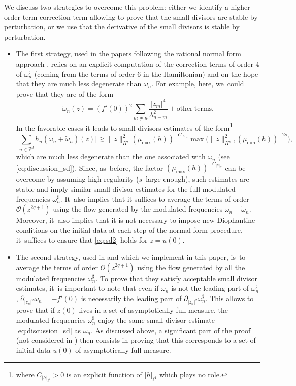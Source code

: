 \documentclass[10pt,a4paper]{amsart}
\theoremstyle{plain}
\theoremstyle{definition}
\newcommand{\1}{\mathbf{1}}
\begin{document}
We discuss two strategies to overcome this problem: either we identify a higher order term correction term allowing to prove that the small divisors are stable by perturbation, or we use that the derivative of the small divisors is stable by perturbation.
\begin{itemize}
\item The first strategy, used in the papers following the rational normal form approach \cite{KillBill,KtA,LX23}, relies on an explicit computation of the correction terms of order $4$ of $\omega_n^\sharp$ (coming from the terms of order 6 in the Hamiltonian) and on the hope that they are much less degenerate than $\omega_n$. For example, here, we~could prove that they are of the form
\[
\widetilde{\omega}_n(z) = (f'(0))^2 \sum_{m \neq n} \frac{|z_m|^4}{\lambda_{n-m}^2} + \mathrm{other \ terms}.
\]
In the favorable cases it leads to small divisors estimates of the form\footnote{where $C_{|h|_{\ell^1}}>0$ is an explicit function of $|h|_{\ell^1}$ which plays no role.}
\begin{equation}
\label{eq:sd2}
\Big| \sum_{n\in \mathbb{Z}^d} h_n (\omega_{n} + \widetilde{\omega}_n)(z) \Big| \gtrsim \| z\|_{H^s}^2 (\mu_{\max}(h))^{-C_{|h|_{\ell^1}}} \max\big(\| z\|_{H^s}^2, (\mu_{\min}(h))^{-2s} \big),
\end{equation}
which are much less degenerate than the one associated with $\omega_n$ (see \eqref{eq:discussion_sd}). Since, as~before, the factor $ (\mu_{\max}(h))^{-C_{|h|_{\ell^1}}}$ can be overcome by assuming high-regularity ($s$~large enough), such estimates are stable and imply similar small divisor estimates for the full modulated frequencies $\omega_n^\sharp$. It~also implies that it suffices to average the terms of order $\mathcal{O}(z^{2q+1})$ using the flow generated by the modulated frequencies $\omega_n+\widetilde{\omega}_n$. Moreover, it~also implies that it is not necessary to impose new Diophantine conditions on the initial data at each step of the normal form procedure, it~suffices to ensure that \eqref{eq:sd2} holds for $z=u(0)$.
\item The second strategy, used in \cite{Bou00} and which we implement in this paper, is~to average the terms of order $\mathcal{O}(z^{2q+1})$ using the flow generated by all the modulated frequencies $\omega_n^\sharp$. To prove that they satisfy acceptable small divisor estimates, it~is important to note that even if $\omega_n$ is not the leading part of $\omega_n^\sharp$, $\partial_{|z_n|^2} \omega_n = - f'(0)$ is necessarily the leading part of $\partial_{|z_n|^2} \omega_n^\sharp$. This allows to prove that if $z(0)$ lives in a set of asymptotically full measure, the modulated frequencies $\omega_n^\sharp$ enjoy the same small divisor estimate \eqref{eq:discussion_sd} as $\omega_n$. As discussed above, a significant part of the proof (not considered in \cite{Bou00}) then consists in proving that this corresponds to a set of initial data $u(0)$ of asymptotically full measure.
\end{itemize}
\end{document}
